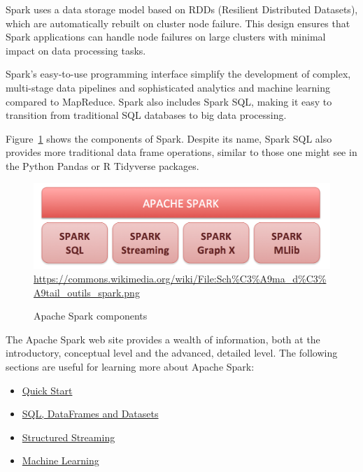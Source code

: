 Spark uses a data storage model based on RDDs (Resilient Distributed Datasets), which are automatically rebuilt on cluster node failure. This design ensures that Spark applications can handle node failures on large clusters with minimal impact on data processing tasks.

Spark's easy-to-use programming interface simplify the development of complex, multi-stage data pipelines and sophisticated analytics and machine learning compared to MapReduce. Spark also includes Spark SQL, making it easy to transition from traditional SQL databases to big data processing.

Figure~\ref{fig:sparkcomponents} shows the components of Spark. Despite its name, Spark SQL also provides more traditional data frame operations, similar to those one might see in the Python Pandas or R Tidyverse packages. 

\begin{figure}
\centering

\includegraphics[width=.75\textwidth]{spark_components.png}
\scriptsize \url{https://commons.wikimedia.org/wiki/File:Sch\%C3\%A9ma_d\%C3\%A9tail_outils_spark.png} \normalsize
\caption{Apache Spark components}
\label{fig:sparkcomponents}
\end{figure}

\begin{tcolorbox}[colback=code]
The Apache Spark web site provides a wealth of information, both at the introductory, conceptual level and the advanced, detailed level. The following sections are useful for learning more about Apache Spark:

\begin{itemize}
\item \href{https://spark.apache.org/docs/latest/quick-start.html}{Quick Start}
\item \href{https://spark.apache.org/docs/latest/sql-programming-guide.html}{SQL, DataFrames and Datasets}
\item \href{https://spark.apache.org/docs/latest/structured-streaming-programming-guide.html}{Structured Streaming}
\item \href{https://spark.apache.org/docs/latest/ml-guide.html}{Machine Learning}
\end{itemize}
\end{tcolorbox}

